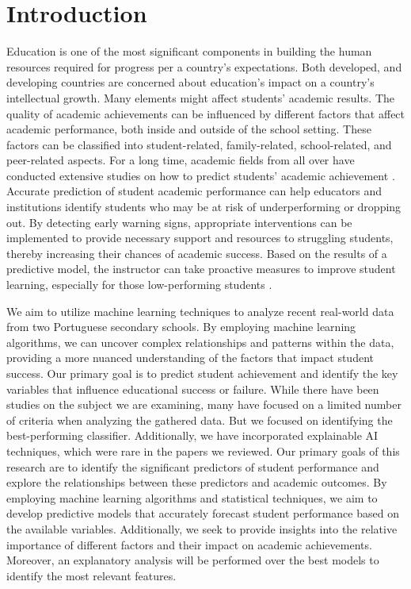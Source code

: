 \documentclass[conference]{IEEEtran}
\begin{document}
\section{Introduction}
Education is one of the most significant components in building the human resources required for progress per a country's expectations. Both developed, and
 developing countries are concerned about education's impact on a country's intellectual growth. Many elements might affect students' academic results\cite{r1}.
 The quality of academic achievements can be influenced by different factors that affect academic performance, both inside and outside of the school setting. These factors can be classified into student-related, family-related, school-related, and peer-related aspects. For a long time, academic fields from all over have conducted extensive studies on how to predict students' academic achievement \cite{r2}. 
 Accurate prediction of student academic performance can help educators and institutions identify students who may be at risk of underperforming or dropping out. By detecting early warning signs, appropriate interventions can be implemented to provide necessary support and resources to struggling students, thereby increasing their chances of academic success. Based on the results of a predictive model, the instructor can take proactive measures to improve student learning, especially for those low-performing students \cite{r3}.\par 
 We aim to utilize machine learning techniques to analyze recent real-world data from two Portuguese secondary schools. By employing machine learning algorithms, we can uncover complex relationships and patterns within the data, providing a more nuanced understanding of the factors that impact student success. Our primary goal is to predict student achievement and identify the key variables that influence educational success or failure. While there have been studies on the subject we are examining, many have focused on a limited number of criteria when analyzing the gathered data. But we focused on identifying the best-performing classifier. Additionally, we have incorporated explainable AI techniques, which were rare in the papers we reviewed. 
Our primary goals of this research are to identify the significant predictors of student performance and explore the relationships between these predictors and academic outcomes. By employing machine learning algorithms and statistical techniques, we aim to develop predictive models that accurately forecast student performance based on the available variables. Additionally, we seek to provide insights into the relative importance of different factors and their impact on academic achievements. Moreover, an explanatory analysis will be performed over the best models to identify the most relevant features.
\end{document}
